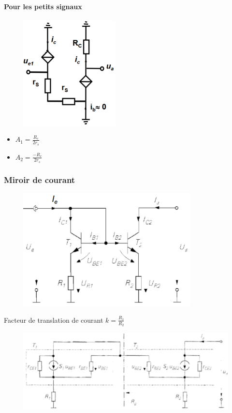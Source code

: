 \documentclass[resume]{subfiles}
\begin{document}
\begin{multicols}{3}
\paragraph{Pour les petits signaux}
\begin{figure}[H]
    \centering
    \includegraphics[width=0.5\columnwidth]{../images/OpAmp1/mPS_diff.png}
\end{figure}
\begin{itemize}
\item $A_1 = \frac{R_c}{2r_s}$
\item $A_2 = \frac{-R_c}{2r_s}$
\end{itemize}

\subsubsection{Miroir de courant}
\begin{figure}[H]
    \centering
    \includegraphics[width=0.6\columnwidth]{../images/OpAmp1/m_mirroir.png}
\end{figure}
Facteur de translation de courant $k = \frac{R_1}{R_2}$
\begin{figure}[H]
    \centering
    \includegraphics[width=0.9\columnwidth]{../images/OpAmp1/mPS_mirroir.png}
\end{figure}


\end{multicols}
\end{document}
